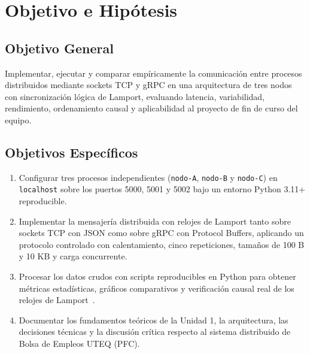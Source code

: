 \section{Objetivo e Hipótesis}

\subsection{Objetivo General}
Implementar, ejecutar y comparar empíricamente la comunicación entre procesos distribuidos mediante sockets TCP y gRPC en una arquitectura de tres nodos con sincronización lógica de Lamport, evaluando latencia, variabilidad, rendimiento, ordenamiento causal y aplicabilidad al proyecto de fin de curso del equipo.

\subsection{Objetivos Específicos}
\begin{enumerate}
  \item Configurar tres procesos independientes (\texttt{nodo-A}, \texttt{nodo-B} y \texttt{nodo-C}) en \texttt{localhost} sobre los puertos 5000, 5001 y 5002 bajo un entorno Python 3.11+ reproducible.
  \item Implementar la mensajería distribuida con relojes de Lamport tanto sobre sockets TCP con JSON como sobre gRPC con Protocol Buffers, aplicando un protocolo controlado con calentamiento, cinco repeticiones, tamaños de 100 B y 10 KB y carga concurrente.
  \item Procesar los datos crudos con scripts reproducibles en Python para obtener métricas estadísticas, gráficos comparativos y verificación causal real de los relojes de Lamport~\cite{castello2024inductive}.
  \item Documentar los fundamentos teóricos de la Unidad 1, la arquitectura, las decisiones técnicas y la discusión crítica respecto al sistema distribuido de Bolsa de Empleos UTEQ (PFC).
\end{enumerate}

